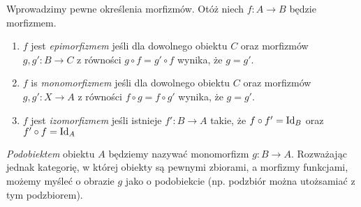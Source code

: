 Wprowadzimy pewne określenia morfizmów. Otóż niech $f:A\to B$ będzie morfizmem.

\begin{enumerate}
  \item $f$ jest \emph{epimorfizmem} jeśli dla dowolnego obiektu $C$ oraz morfizmów $g, g': B\to C$ z równości $g\circ f= g'\circ f$ wynika, że $g=g'$.
  \item $f$ is \emph{monomorfizmem} jeśli dla dowolnego obiektu $C$ oraz morfizmów $g, g': X\to A$ z równości $f\circ g= f\circ g'$ wynika, że
  $g=g'$.
  \item $f$ jest \emph{izomorfizmem} jeśli istnieje $f':B\to A$ takie, że $f\circ f'=\text{Id}_B$ oraz $f'\circ f=\text{Id}_A$
\end{enumerate}




\textit{Podobiektem} obiektu $A$ będziemy nazywać monomorfizm $g: B\to A$. Rozważając jednak kategorię, w której obiekty są pewnymi zbiorami, a morfizmy funkcjami, możemy
myśleć o obrazie $g$ jako o podobiekcie (np. podzbiór można utożsamiać z tym podzbiorem).


